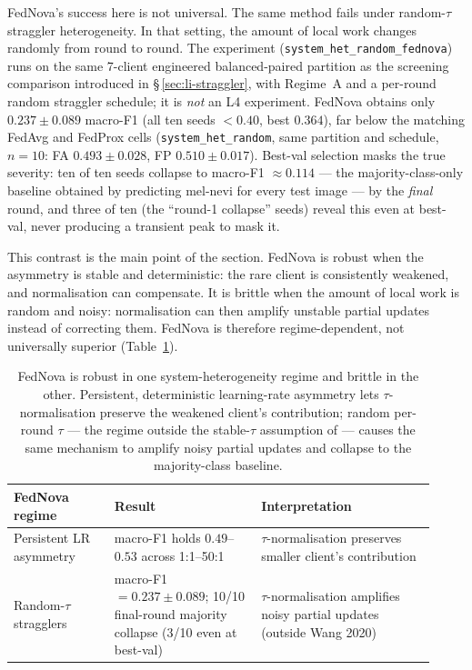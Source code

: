 \documentclass[11pt,a4paper]{report}
\begin{document}
FedNova's success here is not universal. The same method fails under
random-$\tau$ straggler heterogeneity. In that setting, the amount of local
work changes randomly from round to round. The experiment
(\texttt{system\_het\_random\_fednova}) runs on the same 7-client
engineered balanced-paired partition as the screening comparison
introduced in \S\,\ref{sec:li-straggler}, with Regime~A and a per-round
random straggler schedule; it is \emph{not} an L4 experiment. FedNova
obtains only $0.237 \pm 0.089$ macro-F1 (all ten seeds $< 0.40$, best
$0.364$), far below the matching FedAvg and FedProx cells
(\texttt{system\_het\_random}, same partition and schedule, $n = 10$:
FA $0.493 \pm 0.028$, FP $0.510 \pm 0.017$). Best-val selection masks
the true severity: ten of ten seeds collapse to macro-F1
$\approx 0.114$ --- the majority-class-only baseline obtained by
predicting mel-nevi for every test image --- by the \emph{final}
round, and three of ten (the ``round-1 collapse'' seeds) reveal this
even at best-val, never producing a transient peak to mask it.

This contrast is the main point of the section. FedNova is robust when the
asymmetry is stable and deterministic: the rare client is consistently
weakened, and normalisation can compensate. It is brittle when the amount of
local work is random and noisy: normalisation can then amplify unstable
partial updates instead of correcting them. FedNova is therefore
regime-dependent, not universally superior
(Table~\ref{tab:fednova-regime}).

\begin{table}[H]
\centering
\small
\caption{FedNova is robust in one system-heterogeneity regime and brittle in
the other. Persistent, deterministic learning-rate asymmetry lets
$\tau$-normalisation preserve the weakened client's contribution; random
per-round $\tau$ --- the regime outside the stable-$\tau$ assumption of
\citet{wang2020fednova} --- causes the same mechanism to amplify noisy
partial updates and collapse to the majority-class baseline.}
\label{tab:fednova-regime}
\begin{tabular}{p{0.22\linewidth}p{0.32\linewidth}p{0.38\linewidth}}
\hline
FedNova regime & Result & Interpretation \\
\hline
Persistent LR asymmetry & macro-F1 holds $0.49$--$0.53$ across 1:1--50:1 & $\tau$-normalisation preserves smaller client's contribution \\
Random-$\tau$ stragglers & macro-F1 $= 0.237 \pm 0.089$; 10/10 final-round majority collapse (3/10 even at best-val) & $\tau$-normalisation amplifies noisy partial updates (outside Wang 2020) \\
\hline
\end{tabular}
\end{table}
\end{document}
